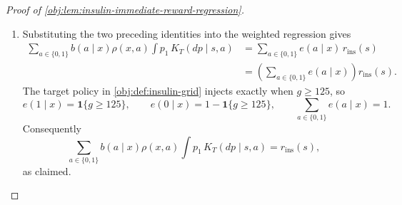 \begin{proof}[Proof of \cref{obj:lem:insulin-immediate-reward-regression}]
\begin{enumerate}
\item Substituting the two preceding identities into the weighted regression gives
\[
\begin{aligned}
\sum_{a\in\{0,1\}}b(a\mid x)\rho(x,a)
   \int p_1\,K_T(dp\mid s,a)
&=
\sum_{a\in\{0,1\}}e(a\mid x)\,r_{\mathrm{ins}}(s)\\
&=
\left(\sum_{a\in\{0,1\}}e(a\mid x)\right)r_{\mathrm{ins}}(s).
\end{aligned}
\]
The target policy in \cref{obj:def:insulin-grid} injects exactly when \(g\ge125\), so
\[
e(1\mid x)=\mathbf 1\{g\ge125\},
\qquad
e(0\mid x)=1-\mathbf 1\{g\ge125\},
\qquad
\sum_{a\in\{0,1\}}e(a\mid x)=1 .
\]
Consequently
\[
\sum_{a\in\{0,1\}}b(a\mid x)\rho(x,a)
   \int p_1\,K_T(dp\mid s,a)
=
r_{\mathrm{ins}}(s),
\]
as claimed. %
\end{enumerate}
\end{proof}
